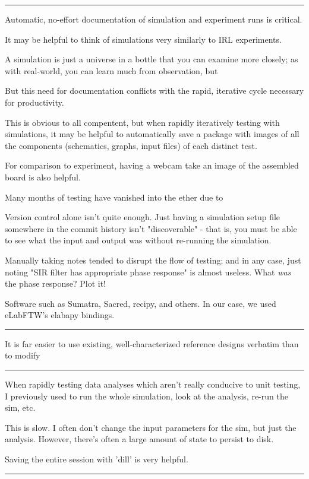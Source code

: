 \documentclass[paper.tex]{subfiles}
\begin{document}
\rule{\linewidth}{0.2pt}

Automatic, no-effort documentation of simulation and experiment runs is critical.

It may be helpful to think of simulations very similarly to IRL experiments. 

A simulation is just a universe in a bottle that you can examine more closely; as with real-world, you can learn much from observation, but 

But this need for documentation conflicts with the rapid, iterative cycle necessary for productivity.

This is obvious to all compentent, but when rapidly iteratively testing with simulations, it may be helpful to automatically save a package with images of all the components (schematics, graphs, input files) of each distinct test. 

For comparison to experiment, having a webcam take an image of the assembled board is also helpful. 

Many months of testing have vanished into the ether due to 

Version control alone isn't quite enough. Just having a simulation setup file somewhere in the commit history isn't "discoverable" - that is, you must be able to see what the input and output was without re-running the simulation. 

Manually taking notes tended to disrupt the flow of testing; and in any case, just noting "SIR filter has appropriate phase response" is almost useless. What {\it was} the phase response? Plot it!

Software such as Sumatra, Sacred, recipy, and others. In our case, we used eLabFTW's elabapy bindings.

\rule{\linewidth}{0.2pt}

It is far easier to use existing, well-characterized reference designs verbatim than to modify 

\rule{\linewidth}{0.2pt}

When rapidly testing data analyses which aren't really conducive to unit testing, I previously used to run the whole simulation, look at the analysis, re-run the sim, etc.

This is slow. I often don't change the input parameters for the sim, but just the analysis. However, there's often a large amount of state to persist to disk.

Saving the entire session with 'dill' is very helpful.

\rule{\linewidth}{0.2pt}
\end{document}
